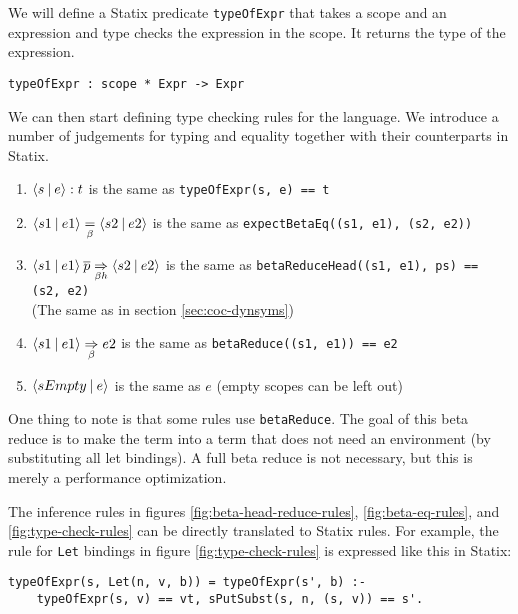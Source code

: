 We will define a Statix predicate \verb|typeOfExpr| that takes a scope and an expression and type checks the expression in the scope. It returns the type of the expression.

\begin{lstlisting}
typeOfExpr : scope * Expr -> Expr
\end{lstlisting}
We can then start defining type checking rules for the language. We introduce a number of judgements for typing and equality together with their counterparts in Statix.
\begin{enumerate}
	\item $\langle s \: | \: e\rangle : t$ is the same as \verb|typeOfExpr(s, e) == t|
	\item $\langle s1 \: | \: e1\rangle \underset{\beta}{=} \langle s2 \: | \: e2\rangle$ is the same as \verb|expectBetaEq((s1, e1), (s2, e2))|
	\item $\langle s1 \: | \: e1\rangle \: \overline{p} \underset{\beta h}{\Rightarrow} \langle s2 \: | \: e2\rangle$ is the same as \verb|betaReduceHead((s1, e1), ps) == (s2, e2)| \\ (The same as in section \ref{sec:coc-dynsyms})
	\item $\langle s1 \: | \: e1\rangle \underset{\beta}{\Rightarrow} e2$ is the same as \verb|betaReduce((s1, e1)) == e2|
	\item $\langle sEmpty \: | \: e\rangle$ is the same as $e$ (empty scopes can be left out)
\end{enumerate}

One thing to note is that some rules use \verb|betaReduce|. The goal of this beta reduce is to make the term into a term that does not need an environment (by substituting all let bindings). A full beta reduce is not necessary, but this is merely a performance optimization.

The inference rules in figures \ref{fig:beta-head-reduce-rules}, \ref{fig:beta-eq-rules}, and \ref{fig:type-check-rules} can be directly translated to Statix rules. For example, the rule for \verb|Let| bindings in figure \ref{fig:type-check-rules} is expressed like this in Statix:
\begin{lstlisting}
typeOfExpr(s, Let(n, v, b)) = typeOfExpr(s', b) :-
    typeOfExpr(s, v) == vt, sPutSubst(s, n, (s, v)) == s'.
\end{lstlisting}

